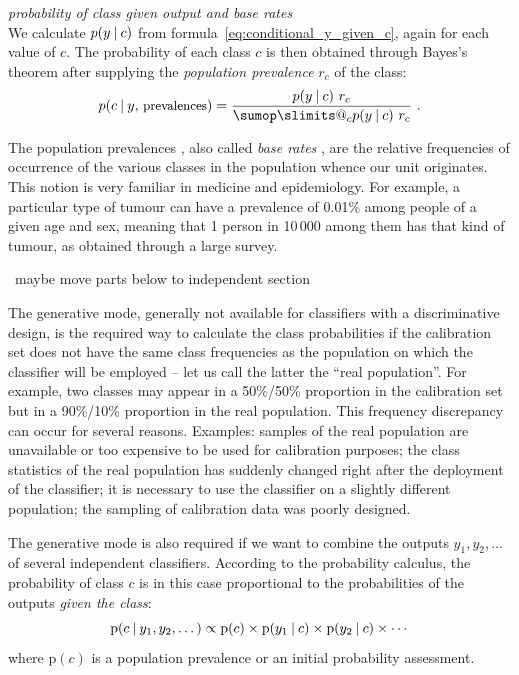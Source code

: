 \documentclass[\ifafour a4paper,12pt,\else a5paper,10pt,\fi%
onecolumn,oneside,article,%
british%
]{memoir}
\makeatletter
\theoremstyle{remark}
\theoremstyle{innote}
\def\sum{\DOTSI\sumop\slimits@}
\newcommand*{\wrench}{{\fontencoding{U}\fontfamily{fontawesomethree}\selectfont\symbol{114}}}
\newcommand{\mynotew}[1]{{\footnotesize\color{notecolour}\wrench\ #1}}
\newcommand*{\p}{\mathrm{p}}%
\renewcommand*{\|}[1][]{\nonscript\:#1\vert\nonscript\:\mathopen{}}
\newcommand*{\sect}{\S}%
\newcommand*{\chap}{ch.}%
\newcommand*{\texts}[1]{\text{\small #1}}
\newcommand*{\br}{r}
\makeatother
\begin{document}
\begin{description}[resume, font=\textit]
\item[Generative mode:] \textit{probability of class given output and base rates}\\
  We calculate $p(y \| c)$ from formula~\eqref{eq:conditional_y_given_c}, again for each value of $c$. The probability of each class $c$ is then obtained through Bayes's theorem after supplying the \emph{population prevalence} $\br_{c}$ of the class:
  \begin{equation}
    \label{eq:bayes_baserate}
    p(c \| y,\, \texts{prevalences}) = \frac{p(y \| c)\ \br_{c}}{ \sum_{c} p(y \| c)\ \br_{c} } \ .
  \end{equation}
\end{description}
The population prevalences \autocites[\chap~3]{soxetal1988_r2013}[\sect~5.1]{huninketal2001_r2014}, also called \emph{base rates} \autocites{barhillel1980,axelsson2000}, are the relative frequencies of occurrence of the various classes in the population whence our unit originates. This notion is very familiar in medicine and epidemiology. For example, a particular type of tumour can have a prevalence of 0.01\% among people of a given age and sex, meaning that 1 person in 10\,000 among them has that kind of tumour, as obtained through a large survey.

\mynotew{maybe move parts below to independent section}

The generative mode, generally not available for classifiers with a discriminative design, is the required way to calculate the class probabilities if the calibration set does not have the same class frequencies as the population on which the classifier will be employed -- let us call the latter the \enquote{real population}. For example, two classes may appear in a 50\%/50\% proportion in the calibration set but in a  90\%/10\% proportion in the real population. This frequency discrepancy can occur for several reasons.  Examples: samples of the real population are unavailable or too expensive to be used for calibration purposes; the class statistics of the real population has suddenly changed right after the deployment of the classifier; it is necessary to use the classifier on a slightly different population; the sampling of calibration data was poorly designed.

The generative mode is also required if we want to combine the outputs $y_{1}, y_{2}, \dotsc$ of several independent classifiers. According to the probability calculus, the probability of class $c$ is in this case proportional to the probabilities of the outputs \emph{given the class}\autocites[\sect~8.9]{jaynes1994_r2003}{hailperin2006}:
\begin{equation}
  \label{eq:combine_probs}
  \p(c \| y_{1}, y_{2}, \dotsc) \propto \p(c) \times
  \p(y_{1} \| c) \times \p(y_{2} \| c)\times \dotsm
\end{equation}
where $\p(c)$ is a population prevalence or an initial probability assessment.
\end{document}
